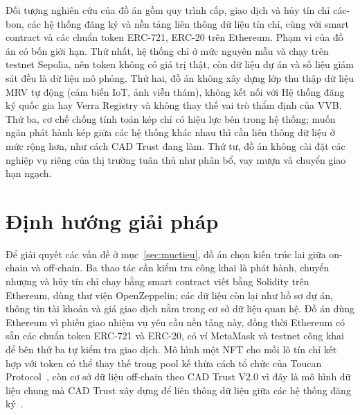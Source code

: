 Đối tượng nghiên cứu của đồ án gồm quy trình cấp, giao dịch và hủy tín chỉ các-bon, các hệ thống đăng ký và nền tảng liên thông dữ liệu tín chỉ, cùng với smart contract và các chuẩn token ERC-721, ERC-20 trên Ethereum. Phạm vi của đồ án có bốn giới hạn. Thứ nhất, hệ thống chỉ ở mức nguyên mẫu và chạy trên testnet Sepolia, nên token không có giá trị thật, còn dữ liệu dự án và số liệu giám sát đều là dữ liệu mô phỏng. Thứ hai, đồ án không xây dựng lớp thu thập dữ liệu MRV tự động (cảm biến IoT, ảnh viễn thám), không kết nối với Hệ thống đăng ký quốc gia hay Verra Registry và không thay thế vai trò thẩm định của VVB. Thứ ba, cơ chế chống tính toán kép chỉ có hiệu lực bên trong hệ thống; muốn ngăn phát hành kép giữa các hệ thống khác nhau thì cần liên thông dữ liệu ở mức rộng hơn, như cách CAD Trust đang làm. Thứ tư, đồ án không cài đặt các nghiệp vụ riêng của thị trường tuân thủ như phân bổ, vay mượn và chuyển giao hạn ngạch.

\section{Định hướng giải pháp}
\label{sec:dinhhuong}
\label{subsec:phuongphap}
\label{subsec:ynghia}

Để giải quyết các vấn đề ở mục~\ref{sec:muctieu}, đồ án chọn kiến trúc lai giữa on-chain và off-chain. Ba thao tác cần kiểm tra công khai là phát hành, chuyển nhượng và hủy tín chỉ chạy bằng smart contract viết bằng Solidity trên Ethereum, dùng thư viện OpenZeppelin; các dữ liệu còn lại như hồ sơ dự án, thông tin tài khoản và giá giao dịch nằm trong cơ sở dữ liệu quan hệ. Đồ án dùng Ethereum vì phiếu giao nhiệm vụ yêu cầu nền tảng này, đồng thời Ethereum có sẵn các chuẩn token ERC-721 và ERC-20, có ví MetaMask và testnet công khai để bên thứ ba tự kiểm tra giao dịch. Mô hình một NFT cho mỗi lô tín chỉ kết hợp với token có thể thay thế trong pool kế thừa cách tổ chức của Toucan Protocol~\cite{toucan2025docs}, còn cơ sở dữ liệu off-chain theo CAD Trust V2.0 vì đây là mô hình dữ liệu chung mà CAD Trust xây dựng để liên thông dữ liệu giữa các hệ thống đăng ký~\cite{cadtrust2025datamodel}.

